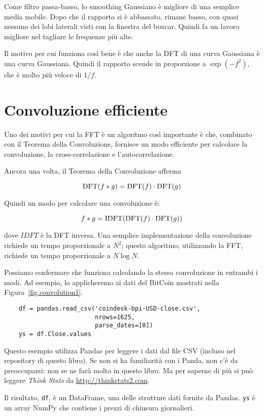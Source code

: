 \documentclass[12pt,a4paper]{book}
\begin{document}
Come filtro passa-basso, lo smoothing Gaussiano è migliore di una semplice media mobile. Dopo che il rapporto si è abbassato, rimane basso, con quasi nessuno dei lobi laterali visti con la finestra del boxcar. Quindi fa un lavoro migliore nel tagliare le frequenze più alte.

Il motivo per cui funziona così bene è che anche la DFT di una curva Gaussiana è una curva Gaussiana. Quindi il rapporto scende in proporzione a $\exp(-f^2)$, che è molto più veloce di $1/f$.

\section{Convoluzione efficiente} \label{effconv} 

Uno dei motivi per cui la FFT è un algoritmo così importante è che, combinato con il Teorema della Convoluzione, fornisce un modo efficiente per calcolare la convoluzione, la cross-correlazione e l'autocorrelazione.

Ancora una volta, il Teorema della Convoluzione afferma

%
\[ \mathrm{DFT}(f \ast g) = \mathrm{DFT}(f) \cdot \mathrm{DFT}(g) \] 

%
Quindi un modo per calcolare una convoluzione è:

%
\[ f \ast g = \mathrm{IDFT}(\mathrm{DFT}(f) \cdot \mathrm{DFT}(g)) \] 

%
dove $IDFT$ è la DFT inversa. Una semplice implementazione della convoluzione richiede un tempo proporzionale a $N^2$; questo algoritmo, utilizzando la FFT, richiede un tempo proporzionale a $N \log N$.

Possiamo confermare che funziona calcolando la stessa convoluzione in entrambi i modi. Ad esempio, lo applicheremo ai dati del BitCoin mostrati nella Figura~\ref{fig.convolution1}.

\begin{verbatim} 
    df = pandas.read_csv('coindesk-bpi-USD-close.csv',
                         nrows=1625,
                         parse_dates=[0])
    ys = df.Close.values
 \end{verbatim} 

Questo esempio utilizza Pandas per leggere i dati dal file CSV (incluso nel repository di questo libro). Se non si ha familiarità con i Panda, non c'è da preoccuparsi: non se ne farà molto in questo libro. Ma per saperne di più si può leggere {\it Think Stats} da \url{http://thinkstats2.com}.

Il risultato, {\tt df}, è un DataFrame, una delle strutture dati fornite da Pandas. {\tt ys} è un array NumPy che contiene i prezzi di chiusura giornalieri.
\end{document}

